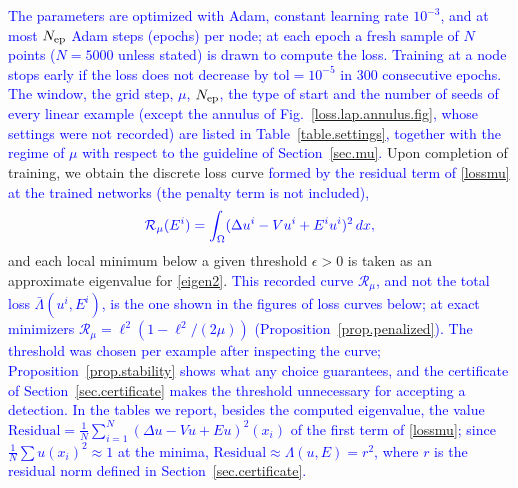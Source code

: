 \documentclass[10pt]{amsart}
\newcommand{\rev}[1]{\textcolor{blue}{#1}}
\theoremstyle{definition}
\theoremstyle{remark}
\theoremstyle{plain}
\begin{document}
\rev{The parameters are optimized with Adam, constant learning rate $10^{-3}$, and at most $N_{\rm ep}$
Adam steps (epochs) per node; at each epoch a fresh sample of $N$ points ($N=5000$ unless stated) is
drawn to compute the loss. Training at a node stops early if the loss does not decrease by
$\mathrm{tol}=10^{-5}$ in 300 consecutive epochs. The window, the grid step, $\mu$, $N_{\rm ep}$, the
type of start and the number of seeds of every linear example (except the annulus of
Fig.~\ref{loss.lap.annulus.fig}, whose settings were not recorded) are listed in Table~\ref{table.settings},
together with the regime of $\mu$ with respect to the guideline of Section~\ref{sec.mu}.} Upon completion of training, we obtain the discrete loss curve
\rev{formed by the residual term of \eqref{lossmu} at the trained networks (the penalty term is not included),}
$$
\rev{\mathcal R_\mu(E^i)=\int_\Omega(\Delta u^i-Vu^i+E^iu^i)^2\,dx,}
$$
and each local minimum below a given threshold $\epsilon>0$ is taken as an approximate eigenvalue for \eqref{eigen2}.
\rev{This recorded curve $\mathcal R_\mu$, and not the total loss $\bar\Lambda(u^i,E^i)$, is the one shown
in the figures of loss curves below; at exact minimizers $\mathcal R_\mu=\ell^2(1-\ell^2/(2\mu))$
(Proposition~\ref{prop.penalized}).}
\rev{The threshold was chosen per example after inspecting the curve; Proposition~\ref{prop.stability}
shows what any choice guarantees, and the certificate of Section~\ref{sec.certificate} makes the
threshold unnecessary for accepting a detection. In the tables we report, besides the computed
eigenvalue, the value $\mathrm{Residual}=\frac1N\sum_{i=1}^N(\Delta u-Vu+Eu)^2(x_i)$ of the first
term of \eqref{lossmu}; since $\frac1N\sum u(x_i)^2\approx1$ at the minima,
$\mathrm{Residual}\approx\Lambda(u,E)=r^2$, where $r$ is the residual norm defined in
Section~\ref{sec.certificate}.}
\end{document}
